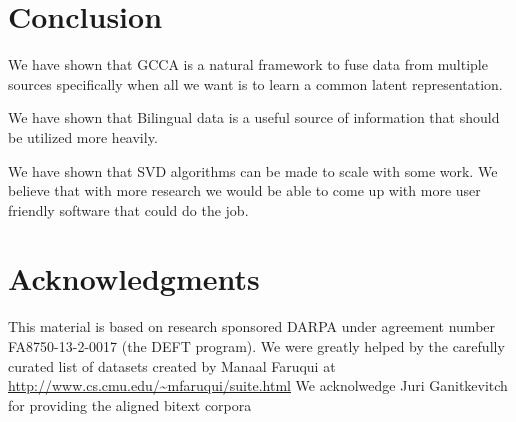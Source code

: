\documentclass[11pt]{article}
\begin{document}
\section{Conclusion}
We have shown that GCCA is a natural framework to fuse data from
multiple sources specifically when all we want is to learn a common
latent representation.

We have shown that Bilingual data is a useful source of information
that should be utilized more heavily.

We have shown that SVD algorithms can be made to scale with some
work. We believe that with more research we would be able to come up
with more user friendly software that could do the job. 

\section*{Acknowledgments}
This material is based on research sponsored DARPA under agreement
number FA8750-13-2-0017 (the DEFT program). We were greatly helped by
the carefully curated list of datasets created by Manaal Faruqui at \url{http://www.cs.cmu.edu/~mfaruqui/suite.html}
We acknolwedge Juri Ganitkevitch for providing the aligned bitext
corpora 


\end{document}
